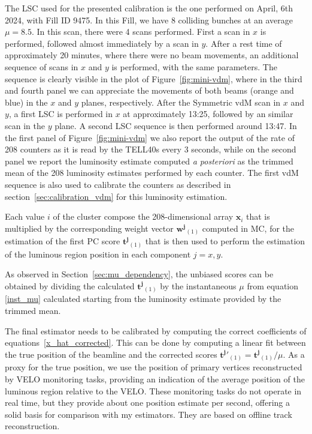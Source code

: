The LSC used for the presented calibration is the one performed on April, 6th 2024, with Fill ID 9475. In this Fill, we have 8 colliding bunches at an average $\mu=8.5$. In this scan, there were 4 scans performed. First a scan in $x$ is performed, followed almost immediately by a scan in $y$. After a rest time of approximately 20 minutes, where there were no beam movements, an additional sequence of scans in $x$ and $y$ is performed, with the same parameters. The sequence is clearly visible in the plot of Figure~\ref{fig:mini-vdm}, where in the third and fourth panel we can appreciate the movements of both beams (orange and blue) in the $x$ and $y$ planes, respectively. After the Symmetric vdM scan in $x$ and $y$, a first LSC is performed in $x$ at approximately 13:25, followed by an similar scan in the $y$ plane. A second LSC sequence is then performed around 13:47. In the first panel of Figure~\ref{fig:mini-vdm} we also report the output of the rate of 208 counters as it is read by the TELL40s every 3 seconds, while on the second panel we report the luminosity estimate computed \textit{a posteriori} as the trimmed mean of the 208 luminosity estimates performed by each counter. The first vdM sequence is also used to calibrate the counters as described in section~\ref{sec:calibration_vdm} for this luminosity estimation. 

Each value $i$ of the cluster compose the 208-dimensional array $\mathbf{x}_i$ that is multiplied by the corresponding weight vector $\mathbf{w^j}_{(1)}$ computed in MC, for the estimation of the first PC score $\mathbf{t^j}_{(1)}$ that is then used to perform the estimation of the luminous region position in each component $j=x,y$. 

As observed in Section~\ref{sec:mu_dependency}, the unbiased scores can be obtained by dividing the calculated $\mathbf{t^j}_{(1)}$ by the instantaneous $\mu$ from equation \eqref{inst_mu} calculated starting from the luminosity estimate provided by the trimmed mean.

The final estimator needs to be calibrated by computing the correct coefficients of equations~\ref{x_hat_corrected}. This can be done by computing a linear fit between the true position of the beamline and the corrected scores $\mathbf{t^j}'_{(1)}=\mathbf{t^j}_{(1)}/\mu$. As a proxy for the true position, we use the position of primary vertices reconstructed by VELO monitoring tasks, providing an indication of the average position of the luminous region relative to the VELO. These monitoring tasks do not operate in real time, but they provide about one position estimate per second, offering a solid basis for comparison with my estimators. They are based on offline track reconstruction.

